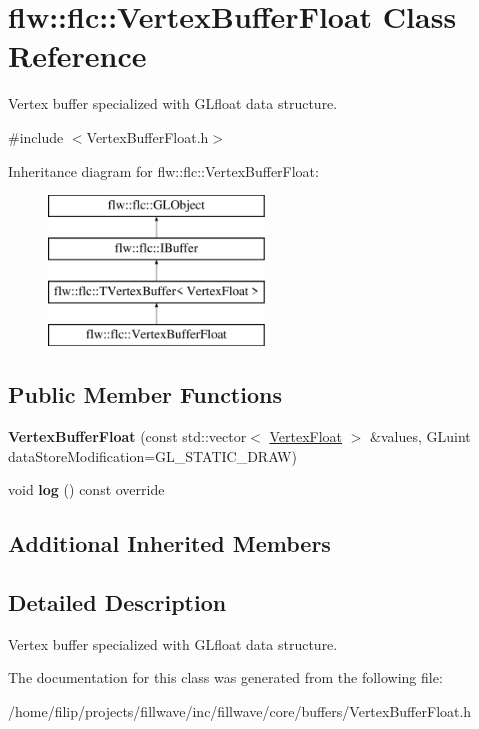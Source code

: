 \hypertarget{classflw_1_1flc_1_1VertexBufferFloat}{}\section{flw\+:\+:flc\+:\+:Vertex\+Buffer\+Float Class Reference}
\label{classflw_1_1flc_1_1VertexBufferFloat}


Vertex buffer specialized with G\+Lfloat data structure.  




{\ttfamily \#include $<$Vertex\+Buffer\+Float.\+h$>$}

Inheritance diagram for flw\+:\+:flc\+:\+:Vertex\+Buffer\+Float\+:\begin{figure}[H]
\begin{center}
\leavevmode
\includegraphics[height=4.000000cm]{classflw_1_1flc_1_1VertexBufferFloat}
\end{center}
\end{figure}
\subsection*{Public Member Functions}
\begin{DoxyCompactItemize}
\item 
\mbox{\label{classflw_1_1flc_1_1VertexBufferFloat_aa2da66a0cd420f50099102443f90174e}} 
{\bfseries Vertex\+Buffer\+Float} (const std\+::vector$<$ \hyperlink{structflw_1_1flc_1_1VertexFloat}{Vertex\+Float} $>$ \&values, G\+Luint data\+Store\+Modification=G\+L\+\_\+\+S\+T\+A\+T\+I\+C\+\_\+\+D\+R\+AW)
\item 
\mbox{\label{classflw_1_1flc_1_1VertexBufferFloat_a1559fe63f4422431e9911b7b5d746552}} 
void {\bfseries log} () const override
\end{DoxyCompactItemize}
\subsection*{Additional Inherited Members}


\subsection{Detailed Description}
Vertex buffer specialized with G\+Lfloat data structure. 

The documentation for this class was generated from the following file\+:\begin{DoxyCompactItemize}
\item 
/home/filip/projects/fillwave/inc/fillwave/core/buffers/Vertex\+Buffer\+Float.\+h\end{DoxyCompactItemize}
